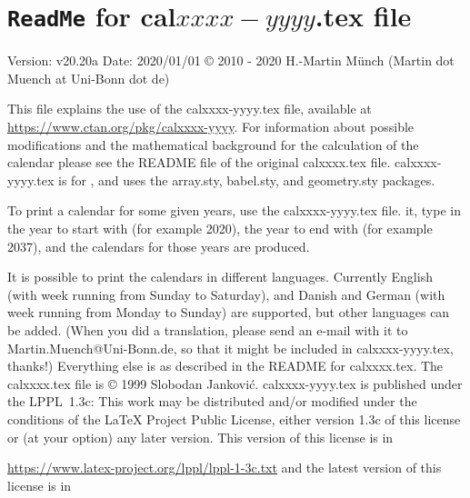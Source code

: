 \documentclass{article}
\begin{document}
\section*{\texttt{ReadMe} for cal$xxxx-yyyy$.tex file}
Version: v20.20a\newline
Date: 2020/01/01\newline
\copyright{} 2010 - 2020 H.-Martin M\"{u}nch (Martin dot Muench at Uni-Bonn dot de)\newline

\noindent This file explains the use of the \textsf{calxxxx-yyyy.tex} file,
available at\newline
\url{https://www.ctan.org/pkg/calxxxx-yyyy}.\newline
\noindent For information about possible modifications and the mathematical background
for the calculation of the calendar please see the README file of the original
\textsf{calxxxx.tex} file. \textsf{calxxxx-yyyy.tex} is for \LaTeXe, and uses
the \textsf{array.sty}, \textsf{babel.sty}, and \textsf{geometry.sty} packages.

\hspace*{-1.98471pt}To print a calendar for some given years,
use the \textsf{calxxxx-yyyy.tex} file. \LaTeXe{} it, type in the year to start with
(for example 2020), the year to end with (for example 2037), and the calendars
for those years are produced.

It is possible to print the calendars in different languages. Currently
English (with week running from Sunday to Saturday),
and Danish and German (with week running from Monday to Sunday) are supported,
but other languages can be added. (When you did a translation, please send
an e-mail with it to {\nolinebreak Martin.Muench@Uni-Bonn.de,}
so that it might be included in \textsf{calxxxx-yyyy.tex}, thanks!)\newline
Everything else is as described in the README for \textsf{calxxxx.tex}.\newline
The \textsf{calxxxx.tex} file is \copyright{} 1999 Slobodan Jankovi\'{c}.\newline
\textsf{calxxxx-yyyy.tex} is published under the LPPL~1.3c: This work may be
distributed and/or modified under the conditions of the \LaTeX{} Project
Public License, either version 1.3c of this license or (at your option) any
later version. This version of this license is in

\url{https://www.latex-project.org/lppl/lppl-1-3c.txt}\newline
and the latest version of this license is in
\end{document}
